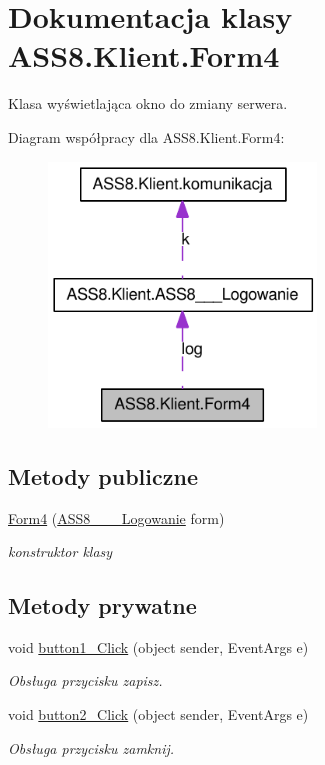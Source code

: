 \hypertarget{a00005}{
\section{Dokumentacja klasy ASS8.Klient.Form4}
\label{dd/dad/a00005}
}
Klasa wyświetlająca okno do zmiany serwera.  


Diagram współpracy dla ASS8.Klient.Form4:\nopagebreak
\begin{figure}[H]
\begin{center}
\leavevmode
\includegraphics[width=202pt]{dc/de6/a00167}
\end{center}
\end{figure}
\subsection*{Metody publiczne}
\begin{CompactItemize}
\item 
\hyperlink{a00005_c9962a9d1b3f147eefe50994127df5d7}{Form4} (\hyperlink{a00001}{ASS8\_\-\_\-\_\-Logowanie} form)
\begin{CompactList}\small\item\em konstruktor klasy \item\end{CompactList}\end{CompactItemize}
\subsection*{Metody prywatne}
\begin{CompactItemize}
\item 
void \hyperlink{a00005_6683aa1b2eba62015b3a0abf81058a9c}{button1\_\-Click} (object sender, EventArgs e)
\begin{CompactList}\small\item\em Obsługa przycisku zapisz. \item\end{CompactList}\item 
void \hyperlink{a00005_a3ef6122bae46a2c4f90562b75b060b5}{button2\_\-Click} (object sender, EventArgs e)
\begin{CompactList}\small\item\em Obsługa przycisku zamknij. \item\end{CompactList}\end{CompactItemize}

